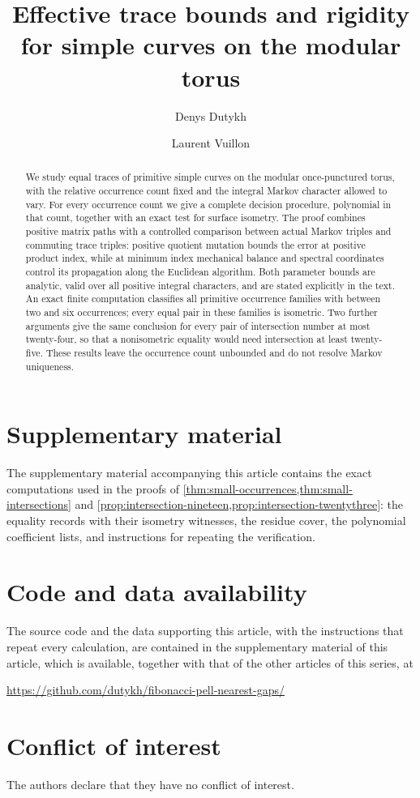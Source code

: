 \documentclass[11pt,reqno]{amsart}
\title[Effective trace bounds on the modular torus]{Effective trace bounds and rigidity\\for simple curves on the modular torus}
\author{Denys Dutykh}
\author{Laurent Vuillon}
\theoremstyle{definition}
\theoremstyle{definition}
\begin{document}
\begin{abstract}
We study equal traces of primitive simple curves on the modular
once-punctured torus, with the relative occurrence count fixed and the
integral Markov character allowed to vary. For every occurrence count we
give a complete decision procedure, polynomial in that count, together
with an exact test for surface isometry. The proof combines positive
matrix paths with a controlled comparison between actual Markov triples
and commuting trace triples: positive quotient mutation bounds the error
at positive product index, while at minimum index mechanical balance and
spectral coordinates control its propagation along the Euclidean
algorithm. Both parameter bounds are analytic, valid over all positive
integral characters, and are stated explicitly in the text. An exact
finite computation classifies all primitive occurrence families with
between two and six occurrences; every equal pair in these families is
isometric. Two further arguments give the same conclusion for every pair
of intersection number at most twenty-four, so that a nonisometric
equality would need intersection at least twenty-five. These results
leave the occurrence count unbounded and do not resolve Markov
uniqueness.
\end{abstract}
\maketitle








\appendix

\section*{Supplementary material}
The supplementary material accompanying this article contains the exact computations used in the proofs
of \cref{thm:small-occurrences,thm:small-intersections} and
\cref{prop:intersection-nineteen,prop:intersection-twentythree}: the
equality records with their isometry witnesses, the residue cover, the
polynomial coefficient lists, and instructions for repeating the
verification.

\section*{Code and data availability}
{ 
The source code and the data supporting this article, with the instructions
that repeat every calculation, are contained in the supplementary material of
this article, which is available, together with that of the other articles of
this series, at
\par}
\begin{center}
  \url{https://github.com/dutykh/fibonacci-pell-nearest-gaps/}
\end{center}

\section*{Conflict of interest}
The authors declare that they have no conflict of interest.



\end{document}
